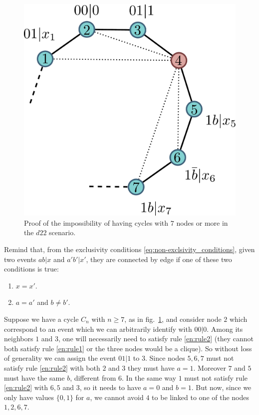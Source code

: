 \documentclass[
    nofootinbin,
    floatfix,
    amsfonts,
    twocolumn, 
    aps, 
    prl]{revtex4-1}
\begin{document}
\begin{figure}[h]
    \centering
    \includegraphics[width=.6\columnwidth]{images/cycle_proof.pdf}
    \caption{Proof of the impossibility of having cycles with $7$ nodes or more
    in the $d22$ scenario.}
    \label{fig:cycle_graph_proof}
\end{figure}
Remind that, from the exclusivity conditions \eqref{eq:non-exclsivity_conditions},
given two events $ab|x$ and $a'b'|x'$, they are connected by edge if one of
these two conditions is true:
\begin{enumerate}
    \item $x=x'$.\label{en:rule1}
    \item $a=a'$ and $b \neq b'$.\label{en:rule2}
\end{enumerate}
Suppose we have a cycle $C_n$ with $n \ge 7$, as in fig.~\ref{fig:cycle_graph_proof},
and consider node $2$ which correspond to an event which we can arbitrarily identify
with $00|0$.
Among its neighbors $1$ and $3$, one will necessarily need to satisfy rule 
\ref{en:rule2} (they cannot both satisfy rule \ref{en:rule1} or 
the three nodes would be a clique).
So without loss of generality we can assign the event $01|1$ to $3$.
Since nodes $5,6,7$ must not satisfy rule \ref{en:rule2} with both $2$ and $3$ 
they must have $a = 1$.
Moreover $7$ and $5$ must have the same $b$, different from $6$.
In the same way $1$ must not satisfy rule \ref{en:rule2} with $6,5$ and $3$, so it
needs to have $a=0$ and $b=1$.
But now, since we only have values $\{0,1\}$ for $a$, we cannot avoid $4$ 
to be linked to one of the nodes $1,2,6,7$.
\end{document}
